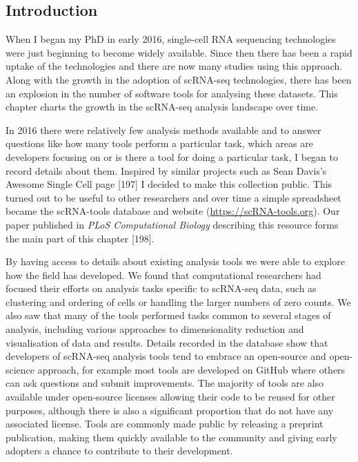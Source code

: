 \documentclass[11pt,a4paper,titlepage,twoside,openright]{style/unimelbthesis}
\theoremstyle{definition}
\theoremstyle{definition}
\theoremstyle{definition}
\theoremstyle{remark}
\begin{document}
\begin{mainmatter}
\hypertarget{introduction-1}{%
\section{Introduction}\label{introduction-1}}

When I began my PhD in early 2016, single-cell RNA sequencing technologies were just beginning to become widely available. Since then there has been a rapid uptake of the technologies and there are now many studies using this approach. Along with the growth in the adoption of scRNA-seq technologies, there has been an explosion in the number of software tools for analysing these datasets. This chapter charts the growth in the scRNA-seq analysis landscape over time.

In 2016 there were relatively few analysis methods available and to answer questions like how many tools perform a particular task, which areas are developers focusing on or is there a tool for doing a particular task, I began to record details about them. Inspired by similar projects such as Sean Davis's Awesome Single Cell page {[}197{]} I decided to make this collection public. This turned out to be useful to other researchers and over time a simple spreadsheet became the scRNA-tools database and website (\url{https://scRNA-tools.org}). Our paper published in \emph{PLoS Computational Biology} describing this resource forms the main part of this chapter {[}198{]}.

By having access to details about existing analysis tools we were able to explore how the field has developed. We found that computational researchers had focused their efforts on analysis tasks specific to scRNA-seq data, such as clustering and ordering of cells or handling the larger numbers of zero counts. We also saw that many of the tools performed tasks common to several stages of analysis, including various approaches to dimensionality reduction and visualisation of data and results. Details recorded in the database show that developers of scRNA-seq analysis tools tend to embrace an open-source and open-science approach, for example most tools are developed on GitHub where others can ask questions and submit improvements. The majority of tools are also available under open-source licenses allowing their code to be reused for other purposes, although there is also a significant proportion that do not have any associated license. Tools are commonly made public by releasing a preprint publication, making them quickly available to the community and giving early adopters a chance to contribute to their development.


\end{mainmatter}
\end{document}
